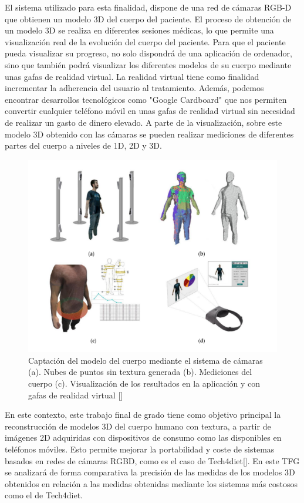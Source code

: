 El sistema utilizado para esta finalidad, dispone de una red de cámaras RGB-D que
obtienen un modelo 3D del cuerpo del paciente. El proceso de obtención de un modelo 3D se realiza en diferentes sesiones médicas, lo que permite una visualización real de la evolución del cuerpo del paciente. Para que el paciente pueda visualizar su progreso, no solo dispondrá de una aplicación de ordenador, sino que también podrá visualizar los diferentes modelos de su cuerpo mediante unas gafas de realidad virtual. La realidad virtual tiene como finalidad incrementar la adherencia del usuario al tratamiento. Además, podemos encontrar desarrollos tecnológicos como "Google Cardboard" que nos permiten convertir cualquier teléfono móvil en unas gafas de realidad virtual sin necesidad de realizar un gasto de dinero elevado.
A parte de la visualización, sobre este modelo 3D obtenido con las cámaras se pueden realizar mediciones de diferentes partes del cuerpo a niveles de 1D, 2D y 3D. 

\begin{figure}[H]
	\centering
	\includegraphics[scale=0.7]{imagenes/intro1.png}
	\caption{Captación del modelo del cuerpo mediante el sistema de cámaras (a). Nubes de puntos sin textura generada (b). Mediciones del cuerpo (c). Visualización de los resultados en la aplicación y con gafas de realidad virtual [\cite{Nahuel1}]}
	\label{fig:figura1}
\end{figure}

En este contexto, este trabajo final de grado tiene como objetivo principal la reconstrucción de modelos 3D del cuerpo humano con textura, a partir de imágenes 2D  adquiridas con dispositivos de consumo como las disponibles en teléfonos móviles. Esto permite mejorar la portabilidad y coste de sistemas basados en redes de cámaras RGBD, como es el caso de Tech4diet[\cite{tech}]. En este TFG se analizará de forma comparativa la precisión de las medidas de los modelos 3D obtenidos en relación a las medidas obtenidas mediante los sistemas más costosos como el de Tech4diet.

